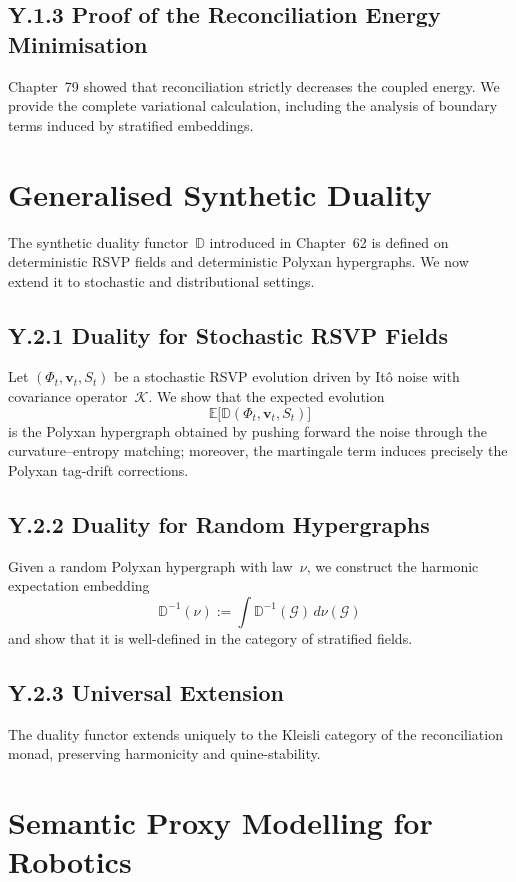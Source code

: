 \subsection{Y.1.3 Proof of the Reconciliation Energy Minimisation}
Chapter~79 showed that reconciliation strictly decreases the coupled energy.
We provide the complete variational calculation, including the analysis of
boundary terms induced by stratified embeddings.


\section{Generalised Synthetic Duality}
\label{sec:Y2}

The synthetic duality functor~$\mathbb{D}$ introduced in Chapter~62 is defined
on deterministic RSVP fields and deterministic Polyxan hypergraphs.  We now
extend it to stochastic and distributional settings.

\subsection{Y.2.1 Duality for Stochastic RSVP Fields}
Let $(\Phi_t,\mathbf{v}_t,S_t)$ be a stochastic RSVP evolution driven by
Itô noise with covariance operator~$\mathcal{K}$.  
We show that the expected evolution
\[
\mathbb{E}\bigl[\mathbb{D}(\Phi_t,\mathbf{v}_t,S_t)\bigr]
\]
is the Polyxan hypergraph obtained by pushing forward the noise through the
curvature--entropy matching; moreover, the martingale term induces precisely the
Polyxan tag-drift corrections.

\subsection{Y.2.2 Duality for Random Hypergraphs}
Given a random Polyxan hypergraph with law~$\nu$, we construct the harmonic
expectation embedding
\[
\mathbb{D}^{-1}(\nu) := \int \mathbb{D}^{-1}(\mathcal{G}) \, d\nu(\mathcal{G})
\]
and show that it is well-defined in the category of stratified fields.

\subsection{Y.2.3 Universal Extension}
The duality functor extends uniquely to the Kleisli category of the reconciliation monad,
preserving harmonicity and quine-stability.


\section{Semantic Proxy Modelling for Robotics}
\label{sec:Y3}

